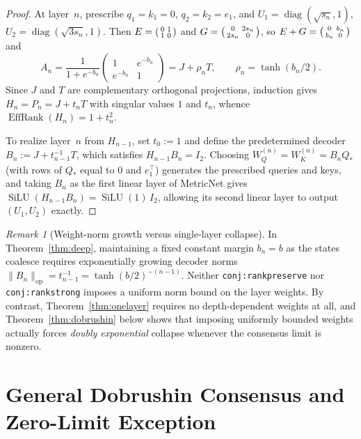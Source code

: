 \documentclass[11pt]{article}
\theoremstyle{plain}
\theoremstyle{definition}
\theoremstyle{remark}
\newtheorem{remark}{Remark}
\DeclareMathOperator{\EffRank}{EffRank}
\DeclareMathOperator{\diag}{diag}
\DeclareMathOperator{\SiLU}{SiLU}
\begin{document}
\begin{proof}
At layer~$n$, prescribe $q_1 = k_1 = 0$, $q_2 = k_2 = e_1$, and $U_1 = \diag(\sqrt{s_n}, 1)$, $U_2 = \diag(\sqrt{3s_n}, 1)$. Then $E = \begin{psmallmatrix}0 & 1 \\ 1 & 0\end{psmallmatrix}$ and $G = \begin{psmallmatrix}0 & 2s_n \\ 2s_n & 0\end{psmallmatrix}$, so $E + G = \begin{psmallmatrix}0 & b_n \\ b_n & 0\end{psmallmatrix}$ and
\[
A_n = \frac{1}{1 + e^{-b_n}}\begin{pmatrix} 1 & e^{-b_n} \\ e^{-b_n} & 1 \end{pmatrix} = J + \rho_n T, \qquad \rho_n = \tanh(b_n/2).
\]
Since $J$ and $T$ are complementary orthogonal projections, induction gives $H_n = P_n = J + t_n T$ with singular values $1$ and $t_n$, whence $\EffRank(H_n) = 1 + t_n^2$.

To realize layer~$n$ from $H_{n-1}$, set $t_0 := 1$ and define the predetermined decoder $B_n := J + t_{n-1}^{-1} T$, which satisfies $H_{n-1} B_n = I_2$. Choosing $W_Q^{(n)} = W_K^{(n)} = B_n Q_*$ (with rows of $Q_*$ equal to $0$ and $e_1^\top$) generates the prescribed queries and keys, and taking $B_n$ as the first linear layer of MetricNet gives $\SiLU(H_{n-1} B_n) = \SiLU(1)\,I_2$, allowing its second linear layer to output $(U_1, U_2)$ exactly.
\end{proof}

\begin{remark}[Weight-norm growth versus single-layer collapse]
In Theorem~\ref{thm:deep}, maintaining a fixed constant margin $b_n = b$ as the states coalesce requires exponentially growing decoder norms $\|B_n\|_{\mathrm{op}} = t_{n-1}^{-1} = \tanh(b/2)^{-(n-1)}$. Neither \texttt{conj:rankpreserve} nor \texttt{conj:rankstrong} imposes a uniform norm bound on the layer weights. By contrast, Theorem~\ref{thm:onelayer} requires no depth-dependent weights at all, and Theorem~\ref{thm:dobrushin} below shows that imposing uniformly bounded weights actually forces \emph{doubly exponential} collapse whenever the consensus limit is nonzero.
\end{remark}

\section{General Dobrushin Consensus and Zero-Limit Exception}
\end{document}
